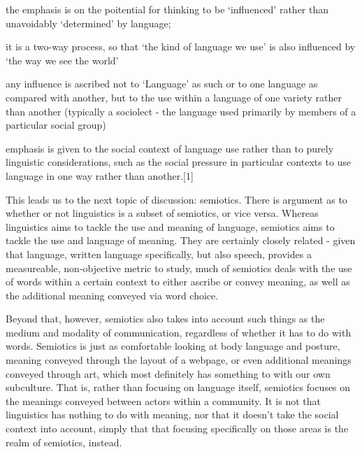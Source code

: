 the emphasis is on the poitential for thinking to be `influenced' rather than unavoidably `determined' by language;

it is a two-way process, so that `the kind of language we use' is also influenced by `the way we see the world'

any influence is ascribed not to `Language' as such or to one language as compared with another, but to the use within a language of one variety rather than another (typically a sociolect - the language used primarily by members of a particular social group)

emphasis is given to the social context of language use rather than to purely linguistic considerations, such as the social pressure in particular contexts to use language in one way rather than another.{[}1{]}

This leads us to the next topic of discussion: semiotics. There is argument as to whether or not linguistics is a subset of semiotics, or vice versa. Whereas linguistics aims to tackle the use and meaning of language, semiotics aims to tackle the use and language of meaning. They are certainly closely related - given that language, written language specifically, but also speech, provides a measureable, non-objective metric to study, much of semiotics deals with the use of words within a certain context to either ascribe or convey meaning, as well as the additional meaning conveyed via word choice.

Beyond that, however, semiotics also takes into account such things as the medium and modality of communication, regardless of whether it has to do with words. Semiotics is just as comfortable looking at body language and posture, meaning conveyed through the layout of a webpage, or even additional meanings conveyed through art, which most definitely has something to with our own subculture. That is, rather than focusing on language itself, semiotics focuses on the meanings conveyed between actors within a community. It is not that linguistics has nothing to do with meaning, nor that it doesn't take the social context into account, simply that that focusing specifically on those areas is the realm of semiotics, instead.

